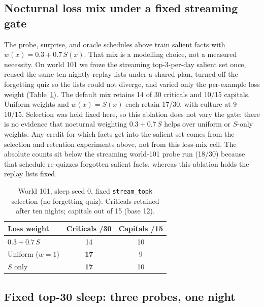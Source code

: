\documentclass[11pt,a4paper]{article}
\begin{document}
\subsection{Nocturnal loss mix under a fixed streaming gate}
\label{sec:e12}

The probe, surprise, and oracle schedules above train salient facts with $w(x)=0.3+0.7\,S(x)$.
That mix is a modelling choice, not a measured necessity.
On world 101 we froze the streaming top-3-per-day salient set once, reused the same ten nightly replay lists under a shared plan, turned off the forgetting quiz so the lists could not diverge, and varied only the per-example loss weight (Table~\ref{tab:e12}).
The default mix retains 14 of 30 criticals and 10/15 capitals.
Uniform weights and $w(x)=S(x)$ each retain 17/30, with culture at 9--10/15.
Selection was held fixed here, so this ablation does not vary the gate: there is no evidence that nocturnal weighting $0.3{+}0.7\,S$ helps over uniform or $S$-only weights.
Any credit for which facts get into the salient set comes from the selection and retention experiments above, not from this loss-mix cell.
The absolute counts sit below the streaming world-101 probe run (18/30) because that schedule re-quizzes forgotten salient facts, whereas this ablation holds the replay lists fixed.

\begin{table}[t]
\centering
\caption{World 101, sleep seed 0, fixed \texttt{stream\_topk} selection (no forgetting quiz). Criticals retained after ten nights; capitals out of 15 (base 12).}
\label{tab:e12}
\small
\begin{tabular}{lcc}
\toprule
Loss weight & Criticals /30 & Capitals /15 \\
\midrule
$0.3{+}0.7\,S$ & 14 & 10 \\
Uniform ($w{=}1$) & \textbf{17} & 9 \\
$S$ only & \textbf{17} & 10 \\
\bottomrule
\end{tabular}
\end{table}

\subsection{Fixed top-30 sleep: three probes, one night}
\label{sec:e15}
\end{document}
